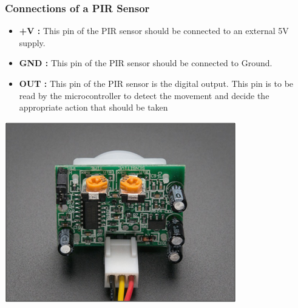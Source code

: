 \documentclass[table,10pt,red]{beamer}	%
\begin{document}
\begin{frame}
\frametitle{Connections of a PIR Sensor}
\pause
	\begin{minipage}[c]{0.52\textwidth}
\begin{itemize}
\justifying
\item <+-|alert@+>  \textbf{+V :} This pin of the PIR sensor should be connected to an
external 5V supply.
\item <+-|alert@+> \textbf{GND :} This pin of the PIR sensor should be connected to
Ground.
\item <+-|alert@+> \textbf{OUT :} This pin of the PIR sensor is the digital output. This pin
is to be read by the microcontroller to detect the movement and
decide the appropriate action that should be taken
\end{itemize}
		\end{minipage}
\begin{minipage}[h]{0.45\textwidth}
\hspace*{5mm}\includegraphics[width=\linewidth]{PIR_Sensor_pins.png}	
		\end{minipage}
\end{frame}



\end{document}
